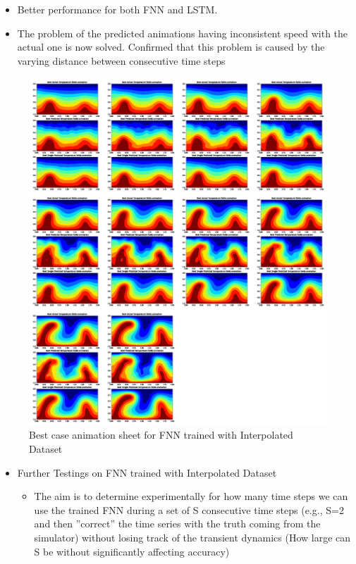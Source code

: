 {\begin{itemize}
\begin{itemize}
            \item Better performance for both FNN and LSTM.
            
            \item The problem of the predicted animations having inconsistent speed with the actual one is now solved. Confirmed that this problem is caused by the varying distance between consecutive time steps
            
    \end{itemize} 
 
        
\end{itemize}

\begin{figure}[H]
    \includegraphics[width=\linewidth]{figures/FNN_animation_sheet.png}
    \caption{Best case animation sheet for FNN trained with Interpolated Dataset}
\end{figure}

\begin{itemize}
    \item Further Testings on FNN trained with Interpolated Dataset
        \begin{itemize}
            \item The aim is to determine experimentally for how many time steps we can use the trained FNN during a set of S consecutive time steps (e.g., S=2 and then ”correct” the time series with the truth coming from the simulator) without losing track of the transient dynamics (How large can S be without significantly affecting accuracy)


\end{itemize}
\end{itemize}}
